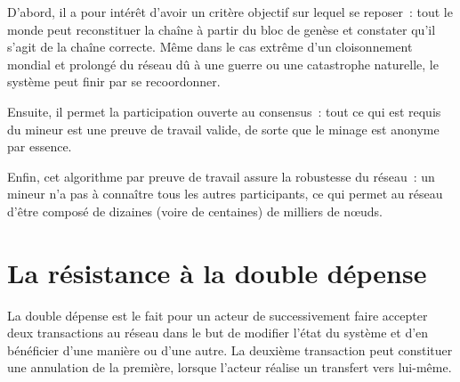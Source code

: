D'abord, il a pour intérêt d'avoir un critère objectif sur lequel se reposer~: tout le monde peut reconstituer la chaîne à partir du bloc de genèse et constater qu'il s'agit de la chaîne correcte. Même dans le cas extrême d'un cloisonnement mondial et prolongé du réseau dû à une guerre ou une catastrophe naturelle, le système peut finir par se recoordonner.

Ensuite, il permet la participation ouverte au consensus~: tout ce qui est requis du mineur est une preuve de travail valide, de sorte que le minage est anonyme par essence.

Enfin, cet algorithme par preuve de travail assure la robustesse du réseau~: un mineur n'a pas à connaître tous les autres participants, ce qui permet au réseau d'être composé de dizaines (voire de centaines) de milliers de nœuds.

\section*{La résistance à la double dépense}

La double dépense est le fait pour un acteur de successivement faire accepter deux transactions au réseau dans le but de modifier l'état du système et d'en bénéficier d'une manière ou d'une autre. La deuxième transaction peut constituer une annulation de la première, lorsque l'acteur réalise un transfert vers lui-même.

